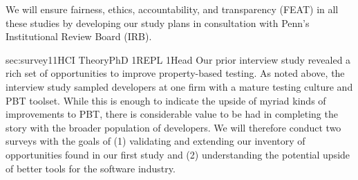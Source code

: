 %

We will ensure
fairness, ethics, accountability, and transparency (FEAT) in all these
studies by developing our study plans in consultation with Penn's
Institutional Review Board (IRB).

%
   {sec:survey}{1}{1}{HCI Theory}{PhD 1}{REPL 1}{Head}
%
Our prior interview study revealed a rich
set of opportunities to improve property-based testing. As noted above, the interview
study sampled developers at one firm with a mature testing culture and PBT toolset.
While this is enough to indicate the upside of myriad kinds of improvements
to PBT, there is considerable value to be had in completing the story with
the broader population of developers.
We will therefore conduct two surveys with the goals of (1) validating and
extending our inventory of opportunities found in our first study and (2)
understanding the potential upside of better tools for the
software industry.


